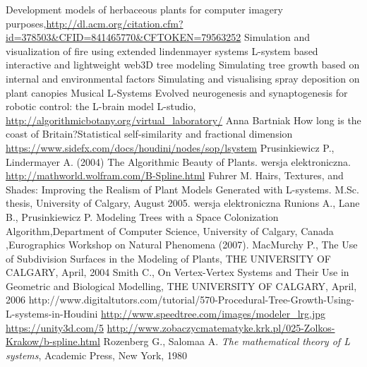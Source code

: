 \documentclass[b5paper,twoside,11pt]{article}
\begin{document}
\begin{thebibliography}{99}
Development models of herbaceous plants for computer imagery purposes,\url{http://dl.acm.org/citation.cfm?id=378503&CFID=841465770&CFTOKEN=79563252}
 Simulation and visualization of fire using extended lindenmayer systems
L-system based interactive and lightweight web3D tree modeling
 Simulating tree growth based on internal and environmental factors
Simulating and visualising spray deposition on plant canopies
Musical L-Systems
Evolved neurogenesis and synaptogenesis for robotic control: the L-brain model
L-studio, \url{http://algorithmicbotany.org/virtual_laboratory/}
Anna Bartniak
How long is the coast of Britain?Statistical self-similarity and fractional dimension 
\url{https://www.sidefx.com/docs/houdini/nodes/sop/lsystem}
Prusinkiewicz P., Lindermayer A. (2004) The Algorithmic Beauty of Plants.  wersja elektroniczna.
\url{http://mathworld.wolfram.com/B-Spline.html}
Fuhrer M. Hairs, Textures, and Shades: Improving the Realism of Plant Models Generated with L-systems. M.Sc. thesis, University of Calgary, August 2005. wersja elektroniczna
Runions A., Lane B., Prusinkiewicz P. Modeling Trees with a Space Colonization Algorithm,Department of Computer Science, University of Calgary, Canada ,Eurographics Workshop on Natural Phenomena (2007).
 MacMurchy P., The Use of Subdivision Surfaces in the Modeling of Plants, THE UNIVERSITY OF CALGARY, April, 2004
 Smith C., On Vertex-Vertex Systems and Their Use in Geometric and Biological Modelling, THE UNIVERSITY OF CALGARY, April, 2006
http://www.digitaltutors.com/tutorial/570-Procedural-Tree-Growth-Using-L-systems-in-Houdini
\url{http://www.speedtree.com/images/modeler_lrg.jpg}
\url{https://unity3d.com/5}
\url{http://www.zobaczycmatematyke.krk.pl/025-Zolkos-Krakow/b-spline.html}
 Rozenberg G., Salomaa A. \textit{The mathematical theory of L systems}, Academic Press, New York, 1980

\end{thebibliography}

\ifdefined\PROCINCLUDED
%
\else
\end{document}
